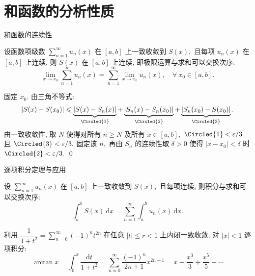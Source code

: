 
\section[分析性质]{和函数的分析性质}


\begin{frame}{和函数的连续性}

\begin{thm}[连续性定理]
设函数项级数 $\sum_{n=1}^\infty u_n(x)$ 在 $[a, b]$ 上一致收敛到 $S(x),$ 且每项 $u_n(x)$ 在 $[a, b]$ 上连续, 则 $S(x)$ 在 $[a, b]$ 上连续, 即极限运算与求和可以交换次序:
\[
\lim_{x \to x_0} \sum_{n=1}^\infty u_n(x) = \sum_{n=1}^\infty \lim_{x \to x_0} u_n(x), \quad \forall ~ x_0 \in [a, b].
\]
\end{thm}

\pause

\startproof[bg=yellow, fg=red]
固定 $x_0.$ 由三角不等式:
\[
|S(x) - S(x_0)| \leqslant \underbrace{|S(x) - S_n(x)|}_{\text{\Circled{1}}} + \underbrace{|S_n(x) - S_n(x_0)|}_{\text{\Circled{2}}} + \underbrace{|S_n(x_0) - S(x_0)|}_{\text{\Circled{3}}}.
\]
\pause
由\alert{一致收敛性,} 取 $N$ 使得对所有 $n \geqslant N$ 及所有 $x \in [a, b],$ $\text{\Circled{1}} < \varepsilon/3$ 且 $\text{\Circled{3}} < \varepsilon/3.$ 固定该 $n,$ 再由 $S_n$ 的\alert{连续性}取 $\delta > 0$ 使得 $|x - x_0| < \delta$ 时 $\text{\Circled{2}} < \varepsilon/3.$
\qed

\end{frame}


\begin{frame}{逐项积分定理与应用}

\begin{thm}[逐项积分定理]
设 $\sum_{n=1}^\infty u_n(x)$ 在 $[a, b]$ 上一致收敛到 $S(x),$ 且每项连续, 则积分与求和可以交换次序:
\[
\int_a^b S(x) ~ \mathrm{d}x = \sum_{n=1}^\infty \int_a^b u_n(x) ~ \mathrm{d}x.
\]
\end{thm}

\pause
\vspace{0.5em}

\begin{eg}
利用 $\dfrac{1}{1+t^2} = \sum_{n=0}^\infty (-1)^n t^{2n}$ 在任意 $|t| \leqslant r < 1$ 上内闭一致收敛, 对 $|x| < 1$ 逐项积分:
\[
\arctan x = \int_0^x \frac{\mathrm{d}t}{1+t^2} = \sum_{n=0}^\infty \frac{(-1)^n}{2n+1} x^{2n+1} = x - \frac{x^3}{3} + \frac{x^5}{5} - \cdots
\]
\end{eg}

\end{frame}

